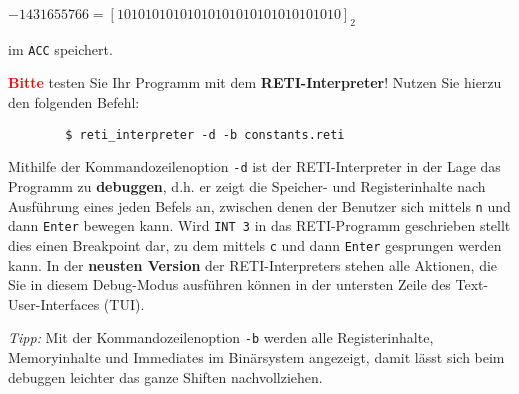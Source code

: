 \documentclass{article}
\begin{document}
	$-1431655766 = [10101010101010101010101010101010]_2$

	im \texttt{ACC} speichert.

  {\LARGE\bfseries\textcolor{red}{Bitte}} testen Sie Ihr Programm mit dem \textbf{RETI-Interpreter}! Nutzen Sie hierzu den folgenden Befehl:
	\begin{verbatim}
		$ reti_interpreter -d -b constants.reti
	\end{verbatim}

  {\color{green}
Mithilfe der Kommandozeilenoption \verb|-d| ist der RETI-Interpreter in der Lage das Programm zu \textbf{debuggen}, d.h. er zeigt die Speicher- und Registerinhalte nach Ausführung eines jeden Befels an, zwischen denen der Benutzer sich mittels \verb|n| und dann \verb|Enter| bewegen kann. Wird \verb|INT 3| in das RETI-Programm geschrieben stellt dies einen Breakpoint dar, zu dem mittels \verb|c| und dann \verb|Enter| gesprungen werden kann. In der \textbf{neusten Version} der RETI-Interpreters stehen alle Aktionen, die Sie in diesem Debug-Modus ausführen können in der untersten Zeile des Text-User-Interfaces (TUI).

\textit{Tipp:} Mit der Kommandozeilenoption \verb|-b| werden alle Registerinhalte, Memoryinhalte und Immediates im Binärsystem angezeigt, damit lässt sich beim debuggen leichter das ganze Shiften nachvollziehen.
}

\end{document}
